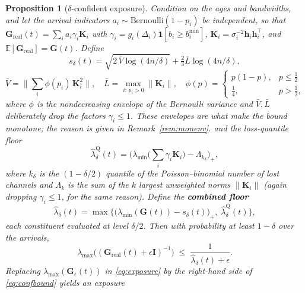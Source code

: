 \documentclass[journal]{IEEEtran}
\theoremstyle{plain}
\newtheorem{proposition}{Proposition}
\theoremstyle{definition}
\theoremstyle{remark}
\newcommand{\bh}{\mathbf{h}}
\newcommand{\bG}{\mathbf{G}}
\newcommand{\bI}{\mathbf{I}}
\newcommand{\lmax}{\lambda_{\max}}
\newcommand{\lmin}{\lambda_{\min}}
\begin{document}
\begin{proposition}[$\delta$-confident exposure]
\label{prop:confident}
Condition on the ages and bandwidths, and let the arrival indicators
$a_i\sim\mathrm{Bernoulli}(1-p_i)$ be independent, so that
$\bG_{\mathrm{real}}(t)=\sum_i a_i\gamma_i\mathbf{K}_i$ with
$\gamma_i=g_i(\Delta_i)\mathbf{1}[b_i\ge b_i^{\min}]$,
$\mathbf{K}_i=\sigma_i^{-2}\bh_i\bh_i^{\top}$, and
$\mathbb{E}[\bG_{\mathrm{real}}]=\bG(t)$. Define
\begin{equation}
s_{\delta}(t)=\sqrt{2\,\bar V\log(4n/\delta)}+\tfrac{2}{3}\bar L\log(4n/\delta),
\label{eq:sdelta}
\end{equation}
\begin{equation}
\bar V=\Big\|\sum_i \phi(p_i)\,\mathbf{K}_i^{2}\Big\|,\quad
\bar L=\max_{i:\,p_i>0}\|\mathbf{K}_i\|,\quad
\phi(p)=\begin{cases}p(1-p), & p\le\tfrac12\\[2pt] \tfrac14,& p>\tfrac12,\end{cases}
\label{eq:envelopes}
\end{equation}
where $\phi$ is the nondecreasing envelope of the Bernoulli variance and
$\bar V,\bar L$ deliberately drop the factors $\gamma_i\le1$. These
\emph{envelopes} are what make the bound monotone; the reason is given in
Remark~\ref{rem:monenv}.
and the \emph{loss-quantile} floor
\begin{equation}
\hat\lambda^{\mathrm{Q}}_{\delta}(t)=\Big(\lmin\big(\textstyle\sum_i\gamma_i\mathbf{K}_i\big)
-\Lambda_{k_\delta}\Big)_{+},
\label{eq:quantfloor}
\end{equation}
where $k_\delta$ is the $(1-\delta/2)$ quantile of the Poisson--binomial
number of lost channels and $\Lambda_{k}$ is the sum of the $k$ largest
\emph{unweighted} norms $\|\mathbf{K}_i\|$ (again dropping
$\gamma_i\le1$, for the same reason). Define the \textbf{combined floor}
\begin{equation}
\hat\lambda_{\delta}(t)=\max\Big\{
\big(\lmin(\bG(t))-s_{\delta}(t)\big)_{+},\;
\hat\lambda^{\mathrm{Q}}_{\delta}(t)\Big\},
\label{eq:combfloor}
\end{equation}
each constituent evaluated at level $\delta/2$. Then with probability at
least $1-\delta$ over the arrivals,
\begin{equation}
\lmax\!\big((\bG_{\mathrm{real}}(t)+\epsilon\bI)^{-1}\big)\;\le\;
\frac{1}{\hat\lambda_{\delta}(t)+\epsilon}.
\label{eq:confbound}
\end{equation}
Replacing $\lmax(\bG_{\epsilon}(t))$ in \eqref{eq:exposure} by the
right-hand side of \eqref{eq:confbound} yields an exposure

\end{proposition}
\end{document}
